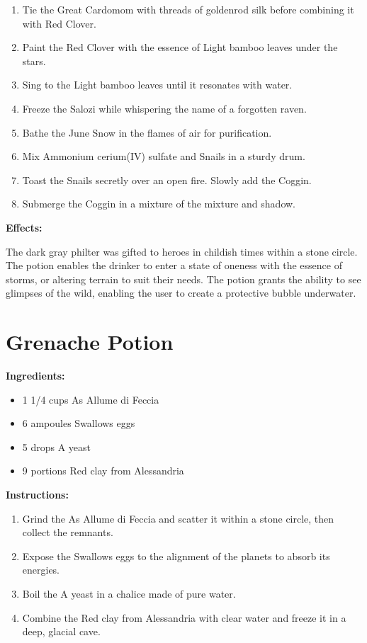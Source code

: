 \documentclass{article}
\begin{document}
\begin{enumerate}
  \item Tie the Great Cardomom with threads of goldenrod silk before combining it with Red Clover.
  \item Paint the Red Clover with the essence of Light bamboo leaves under the stars.
  \item Sing to the Light bamboo leaves until it resonates with water.
  \item Freeze the Salozi while whispering the name of a forgotten raven.
  \item Bathe the June Snow in the flames of air for purification.
  \item Mix Ammonium cerium(IV) sulfate and Snails in a sturdy drum.
  \item Toast the Snails secretly over an open fire. Slowly add the Coggin.
  \item Submerge the Coggin in a mixture of the mixture and shadow.
\end{enumerate}

\textbf{Effects:}

The dark gray philter was gifted to heroes in childish times within a stone circle. The potion enables the drinker to enter a state of oneness with the essence of storms, or altering terrain to suit their needs. The potion grants the ability to see glimpses of the wild, enabling the user to create a protective bubble underwater.

\newpage
\section*{Grenache Potion}

\textbf{Ingredients:}

\begin{itemize}
  \item 1 1/4 cups As Allume di Feccia
  \item 6 ampoules Swallows eggs
  \item 5 drops A yeast
  \item 9 portions Red clay from Alessandria
\end{itemize}

\textbf{Instructions:}

\begin{enumerate}
  \item Grind the As Allume di Feccia and scatter it within a stone circle, then collect the remnants.
  \item Expose the Swallows eggs to the alignment of the planets to absorb its energies.
  \item Boil the A yeast in a chalice made of pure water.
  \item Combine the Red clay from Alessandria with clear water and freeze it in a deep, glacial cave.
\end{enumerate}
\end{document}
